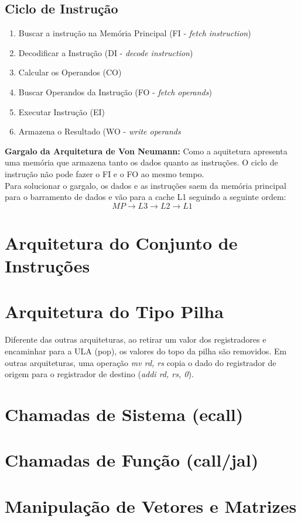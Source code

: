 \documentclass{article}
\begin{document}
		\subsection{Ciclo de Instrução}
			\begin{enumerate}
				\item Buscar a instrução na Memória Principal (FI - \textit{fetch instruction})
				\item Decodificar a Instrução (DI - \textit{decode instruction})
				\item Calcular os Operandos (CO)
				\item Buscar Operandos da Instrução (FO - \textit{fetch operands})
				\item Executar Instrução (EI)
				\item Armazena o Resultado (WO - \textit{write operands}
			\end{enumerate}
		\textbf{Gargalo da Arquitetura de Von Neumann:} Como a aquitetura apresenta uma memória que armazena tanto os dados quanto as instruções. O ciclo de instrução não pode fazer o FI e o FO ao mesmo tempo.\\
		Para solucionar o gargalo, os dados e as instruções saem da memória principal para o barramento de dados e vão para a cache L1 seguindo a seguinte ordem:
		$$MP \to L3 \to L2 \to L1$$
	\section{Arquitetura do Conjunto de Instruções}
	\section{Arquitetura do Tipo Pilha}
		Diferente das outras arquiteturas, ao retirar um valor dos registradores e encaminhar para a ULA (pop), os valores do topo da pilha são removidos. Em outras arquiteturas, uma operação \textit{mv rd, rs} copia o dado do registrador de origem para o registrador de destino (\textit{addi rd, rs, 0}).
	\section{Chamadas de Sistema (ecall)}
	\section{Chamadas de Função (call/jal)}
	\section{Manipulação de Vetores e Matrizes}
\end{document}
